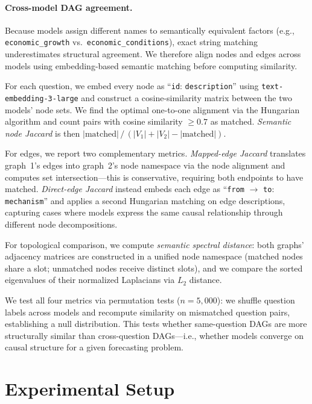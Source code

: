 \documentclass[11pt]{article}
\begin{document}
\paragraph{Cross-model DAG agreement.}
Because models assign different names to semantically equivalent factors (e.g., \texttt{economic\_growth} vs.\ \texttt{economic\_conditions}), exact string matching underestimates structural agreement. We therefore align nodes and edges across models using embedding-based semantic matching before computing similarity.

For each question, we embed every node as ``\texttt{id}: \texttt{description}'' using \texttt{text-embedding-3-large} and construct a cosine-similarity matrix between the two models' node sets. We find the optimal one-to-one alignment via the Hungarian algorithm \cite{kuhn1955hungarian} and count pairs with cosine similarity $\geq 0.7$ as matched. \emph{Semantic node Jaccard} is then $|\text{matched}| \,/\, (|V_1| + |V_2| - |\text{matched}|)$.

For edges, we report two complementary metrics. \emph{Mapped-edge Jaccard} translates graph~1's edges into graph~2's node namespace via the node alignment and computes set intersection---this is conservative, requiring both endpoints to have matched. \emph{Direct-edge Jaccard} instead embeds each edge as ``\texttt{from} $\to$ \texttt{to}: \texttt{mechanism}'' and applies a second Hungarian matching on edge descriptions, capturing cases where models express the same causal relationship through different node decompositions.

For topological comparison, we compute \emph{semantic spectral distance}: both graphs' adjacency matrices are constructed in a unified node namespace (matched nodes share a slot; unmatched nodes receive distinct slots), and we compare the sorted eigenvalues of their normalized Laplacians via $L_2$ distance.

We test all four metrics via permutation tests ($n = 5{,}000$): we shuffle question labels across models and recompute similarity on mismatched question pairs, establishing a null distribution. This tests whether same-question DAGs are more structurally similar than cross-question DAGs---i.e., whether models converge on causal structure for a given forecasting problem.

\section{Experimental Setup}
\label{sec:setup}
\end{document}
